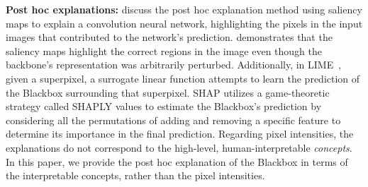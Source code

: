 

\textbf{Post hoc explanations:} \cite{simonyan2013deep, selvaraju2017grad, smilkov2017smoothgrad} discuss the post hoc explanation method using saliency maps to explain a convolution neural network, highlighting the pixels in the input images that contributed to the network's prediction. \cite{adebayo2018sanity, kindermans2019reliability}  demonstrates that the saliency maps highlight the correct regions in the image even though the backbone's representation was arbitrarily perturbed. Additionally, in LIME~\cite{ribeiro2016should}, given a superpixel, a surrogate linear function attempts to learn the prediction of the Blackbox surrounding that superpixel. SHAP \cite{SHAP} utilizes a game-theoretic strategy called SHAPLY values to estimate the Blackbox's prediction by considering all the permutations of adding and removing a specific feature to determine its importance in the final prediction. Regarding pixel intensities, the explanations do not correspond to the high-level, human-interpretable \emph{concepts}. In this paper, we provide the post hoc explanation of the Blackbox in terms of the interpretable concepts, rather than the pixel intensities.

